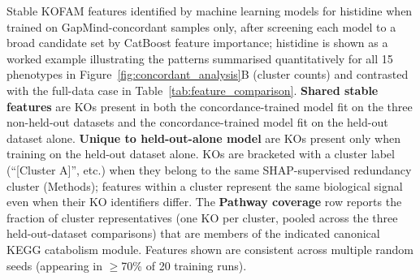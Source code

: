 \begin{table}[h]
\caption{Stable KOFAM features identified by machine learning models for histidine when trained on GapMind-concordant samples only, after screening each model to a broad candidate set by CatBoost feature importance; histidine is shown as a worked example illustrating the patterns summarised quantitatively for all 15 phenotypes in Figure~\ref{fig:concordant_analysis}B (cluster counts) and contrasted with the full-data case in Table~\ref{tab:feature_comparison}. \textbf{Shared stable features} are KOs present in both the concordance-trained model fit on the three non-held-out datasets and the concordance-trained model fit on the held-out dataset alone. \textbf{Unique to held-out-alone model} are KOs present only when training on the held-out dataset alone. KOs are bracketed with a cluster label (``[Cluster A]'', etc.) when they belong to the same SHAP-supervised redundancy cluster (Methods); features within a cluster represent the same biological signal even when their KO identifiers differ. The \textbf{Pathway coverage} row reports the fraction of cluster representatives (one KO per cluster, pooled across the three held-out-dataset comparisons) that are members of the indicated canonical KEGG catabolism module. Features shown are consistent across multiple random seeds (appearing in $\geq$70\% of 20 training runs).}
\label{tab:feature_comparison_concordant}
\end{table}
